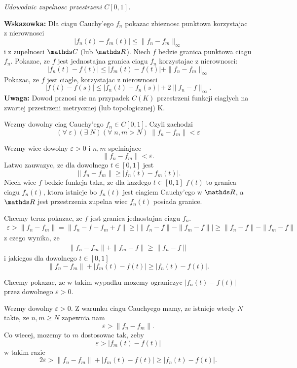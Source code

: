 \documentclass{article}
\begin{document}
    \emph{
        Udowodnic zupelnosc przestrzeni $C[0,1]$.
    }

    \textbf{Wskazowka:} Dla ciagu Cauchy'ego $f_n$ pokazac zbieznosc punktowa korzystajac z nierownosci
    $$|f_n(t)-f_m(t)|\leq\|f_n-f_m\|_\infty$$
    i z zupelnosci $\C$ (lub $\R$). Niech $f$ bedzie granica punktowa ciagu $f_n$. Pokazac, ze $f$ jest jednostajna granica ciagu $f_n$ korzystajac z nierownosci:
    $$|f_n(t)-f(t)|\leq |f_m(t)-f(t)|+\|f_n-f_m\|_\infty$$
    Pokazac, ze $f$ jest ciagle, korzystajac z nierownosci
    $$|f(t)-f(s)|\leq |f_n(t)-f_n(s)|+2\|f_n-f\|_\infty.$$
    \textbf{Uwaga:} Dowod prznosi sie na przypadek $C(K)$ przestrzeni funkcji ciaglych na zwartej przestrzeni metrycznej (lub topologicznej) K.
    \medskip

    \medskip

    
    Wezmy dowolny ciag Cauchy'ego $f_n\in C[0,1]$. Czyli zachodzi
    $$(\forall\;\varepsilon)(\exists\;N)(\forall\;n,m>N)\;\|f_n-f_m\|<\varepsilon$$

    Wezmy wiec dowolny $\varepsilon>0$ i $n,m$ spelniajace
    $$\|f_n-f_m\|<\varepsilon.$$
    Latwo zauwazyc, ze dla dowolnego $t\in[0,1]$ jest
    $$\|f_n-f_m\|\geq |f_n(t)-f_m(t)|.$$
    Niech wiec $f$ bedzie funkcja taka, ze dla kazdego $t\in[0,1]$ $f(t)$ to granica ciagu $f_n(t)$, ktora istnieje bo $f_n(t)$ jest ciagiem Cauchy'ego w $\R$, a $\R$ jest przestrzenia zupelna wiec $f_n(t)$ posiada granice.

    Chcemy teraz pokazac, ze $f$ jest granica jednostajna ciagu $f_n$.
    \begin{align*}
        \varepsilon>\|f_n-f_m\|=\|f_n-f-f_m+f\|\geq|\|f_n-f\|-\|f_m-f\||\geq \|f_n-f\|-\|f_m-f\|
    \end{align*}
    z czego wynika, ze
    \begin{align*}
        \|f_n-f_m\|+\|f_m-f\|\geq\|f_n-f\|
    \end{align*}
    i jakiegos dla dowolnego $t\in [0,1]$
    $$\|f_n-f_m\|+|f_m(t)-f(t)|\geq |f_n(t)-f(t)|.$$

    Chcemy pokazac, ze w takim wypadku mozemy ograniczyc $|f_n(t)-f(t)|$ przez dowolnego $\varepsilon>0$.

    Wezmy dowolny $\varepsilon>0$. Z warunku ciagu Cauchyego mamy, ze istnieje wtedy $N$ takie, ze $n,m\geq N$ zapewnia nam
    $$\varepsilon>\|f_n-f_m\|.$$
    Co wiecej, mozemy to $m$ dostosowac tak, zeby
    $$\varepsilon>|f_m(t)-f(t)|$$
    w takim razie
    $$2\varepsilon>\|f_n-f_m\|+|f_m(t)-f(t)|\geq |f_n(t)-f(t)|.$$
\end{document}
